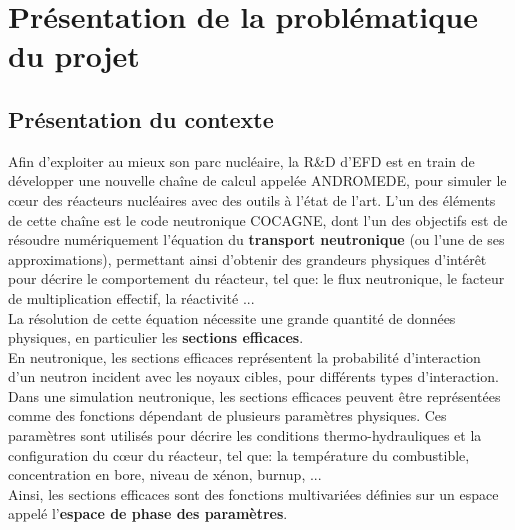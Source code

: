 \section{Présentation de la problématique du projet}\label{sec:3}

\subsection{Présentation du contexte}\label{sec:3.1}
\hspace{0.5cm}
Afin d'exploiter au mieux son parc nucléaire, la R\&D d'EFD est en train de développer une nouvelle chaîne de calcul appelée ANDROMEDE, pour simuler le cœur des réacteurs nucléaires avec des outils à l'état de l'art. L'un des éléments de cette chaîne est le code neutronique COCAGNE, dont l'un des objectifs est de résoudre numériquement l'équation du \textbf{transport neutronique} (ou l'une de ses approximations), permettant ainsi d'obtenir des grandeurs physiques d'intérêt pour décrire le comportement du réacteur, tel que: le flux neutronique, le facteur de multiplication effectif, la réactivité ... \\
La résolution de cette équation nécessite une grande quantité de données physiques, en particulier les \textbf{sections efficaces}. \\

En neutronique, les sections efficaces représentent la probabilité d'interaction d'un neutron incident avec les noyaux cibles, pour différents types d'interaction. Dans une simulation neutronique, les sections efficaces peuvent être représentées comme des fonctions dépendant de plusieurs paramètres physiques. Ces paramètres sont utilisés pour décrire les conditions thermo-hydrauliques et la configuration du cœur du réacteur, tel que: la température du combustible, concentration en bore, niveau de xénon, burnup, ... \\
Ainsi, les sections efficaces sont des fonctions multivariées définies sur un espace appelé l'\textbf{espace de phase des paramètres}. \\

